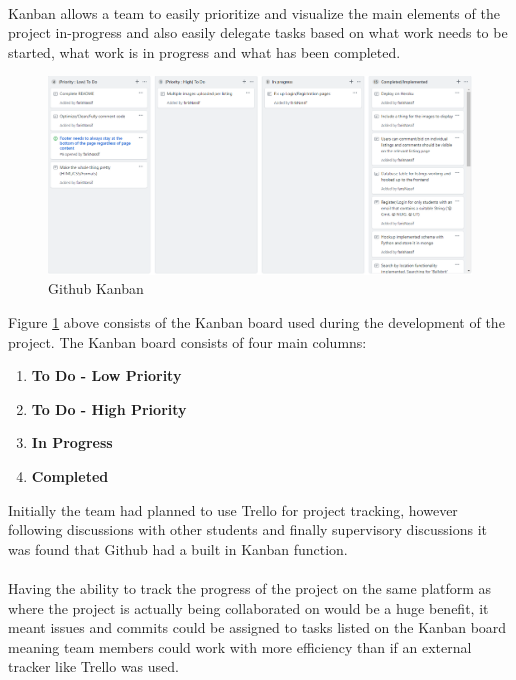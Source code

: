 \paragraph{}
Kanban allows a team to easily prioritize and visualize the main elements of the project in-progress and also easily delegate tasks based on what work needs to be started, what work is in progress and what has been completed.

\begin{figure}[H]
	\caption{Github Kanban}
	\label{image:kanban}
	\centering
	\includegraphics[width=1\textwidth]{images/kanban.png}
\end{figure}

Figure \ref{image:kanban} above consists of the Kanban board used during the development of the project. The Kanban board consists of four main columns:

\begin{enumerate}
  \item \textbf{To Do - Low Priority}
  \item \textbf{To Do - High Priority}
  \item \textbf{In Progress}
  \item \textbf{Completed}
\end{enumerate}

Initially the team had planned to use Trello \cite{TRELLO} for project tracking, however following discussions with other students and finally supervisory discussions it was found that Github had a built in Kanban function. 

\paragraph{}
Having the ability to track the progress of the project on the same platform as where the project is actually being collaborated on would be a huge benefit, it meant issues and commits could be assigned to  tasks listed on the Kanban board meaning team members could work with more efficiency than if an external tracker like Trello was used.

